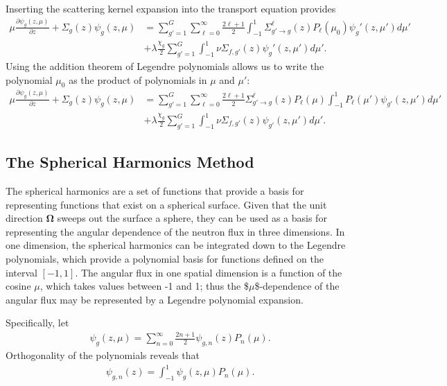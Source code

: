 \documentclass[11pt]{article}
\renewcommand\vec{\mathbf}
\begin{document}
Inserting the scattering kernel expansion into the transport equation provides
\begin{align}
  \mu \frac{\partial \psi_g(z,\mu)}{\partial z}
  + \Sigma_g(z) \psi_g(z,\mu)
  &= \sum_{g'=1}^G \sum_{\ell=0}^\infty \frac{2\ell+1}{2} \int_{-1}^1 \Sigma_{g' \rightarrow g}^\ell(z) P_\ell(\mu_0) \psi_g'(z,\mu') d\mu' \\
  &+ \lambda\frac{\chi_g}{2} \sum_{g'=1}^G \int_{-1}^1 \nu\Sigma_{f,g'}(z) \psi_g'(z,\mu') d\mu'.
\end{align}
Using the addition theorem of Legendre polynomials allows us to write the polynomial \(\mu_0\) as the product of polynomials in \(\mu\) and \(\mu'\):
\begin{align}
  \mu \frac{\partial \psi_g(z,\mu)}{\partial z}
  + \Sigma_g(z) \psi_g(z,\mu)
  &= \sum_{g'=1}^G \sum_{\ell=0}^\infty \frac{2\ell+1}{2} \Sigma_{g' \rightarrow g}^\ell(z) P_\ell(\mu) \int_{-1}^1 P_\ell(\mu') \psi_{g'}(z,\mu') d\mu' \\
  &+ \lambda\frac{\chi_g}{2} \sum_{g'=1}^G \int_{-1}^1 \nu\Sigma_{f,g'}(z) \psi_{g'}(z,\mu') d\mu'.
  \label{eq::1dTransportWithScatteringExpansion}
\end{align}

\subsection{The Spherical Harmonics Method}
\label{sec:orgheadline12}
The spherical harmonics are a set of functions that provide a basis for representing functions that exist on a spherical surface.  Given that the unit direction \(\vec{\Omega}\) sweeps out the surface a sphere, they can be used as a basis for representing the angular dependence of the neutron flux in three dimensions.  In one dimension, the spherical harmonics can be integrated down to the Legendre polynomials, which provide a polynomial basis for functions defined on the interval \([-1,1]\).  The angular flux in one spatial dimension is a function of the cosine \(\mu\), which takes values between -1 and 1; thus the \$\(\mu\)\$-dependence of the angular flux may be represented by a Legendre polynomial expansion.

Specifically, let
\begin{align}
  \psi_g(z,\mu) = \sum_{n=0}^\infty \frac{2n+1}{2} \psi_{g,n}(z) P_n(\mu).
\end{align}
Orthogonality of the polynomials reveals that
\begin{align}
  \psi_{g,n}(z) = \int_{-1}^1 \psi_g(z,\mu) P_n(\mu).
\end{align}
\end{document}
